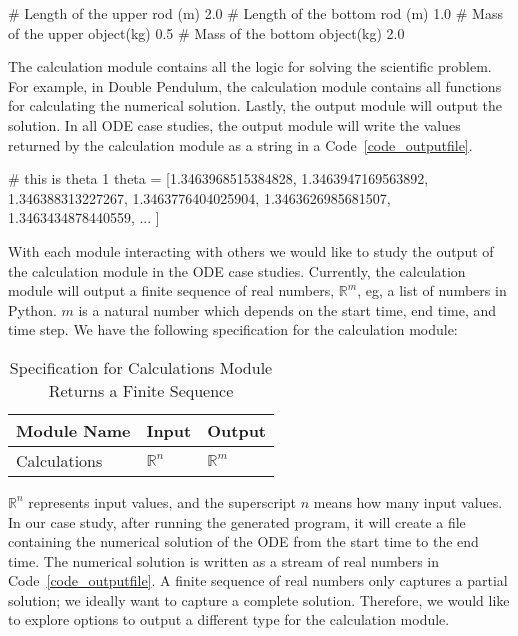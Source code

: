 \begin{listing}[ht]
\begin{python1}
# Length of the upper rod (m)
2.0
# Length of the bottom rod (m)
1.0
# Mass of the upper object(kg)
0.5
# Mass of the bottom object(kg)
2.0
\end{python1}
\label{code_inputfile}
\end{listing}

The calculation module contains all the logic for solving the scientific problem. For example, in Double Pendulum, the calculation module contains all functions for calculating the numerical solution. Lastly, the output module will output the solution. In all ODE case studies, the output module will write the values returned by the calculation module as a string in a Code~\ref{code_outputfile}. 

\begin{listing}[ht]
\begin{python1}
# this is theta 1
theta = [1.3463968515384828, 1.3463947169563892, 1.346388313227267, 1.3463776404025904, 1.3463626985681507, 1.3463434878440559, ... ]
\end{python1}
\label{code_outputfile}
\end{listing}

With each module interacting with others we would like to study the output of the calculation module in the ODE case studies. Currently, the calculation module will output a finite sequence of real numbers, $\mathbb{R}^m$, eg, a list of numbers in Python. $m$ is a natural number which depends on the start time, end time, and time step. We have the following specification for the calculation module:

\begin{table}[ht]
\centering
\begin{tabular}{p{} | p{} | p{}} \hline
    \textbf{Module Name}&\textbf{Input}&\textbf{Output}\\
    \toprule
    Calculations & $\mathbb{R}^n$ & $\mathbb{R}^m$ \\
    \bottomrule	
\end{tabular}	
\caption{Specification for Calculations Module Returns a Finite Sequence}	
\label{tab_srsforcal}
\end{table}
$\mathbb{R}^n$ represents input values, and the superscript $n$ means how many input values. In our case study, after running the generated program, it will create a file containing the numerical solution of the ODE from the start time to the end time. The numerical solution is written as a stream of real numbers in Code~\ref{code_outputfile}. A finite sequence of real numbers only captures a partial solution; we ideally want to capture a complete solution. Therefore, we would like to explore options to output a different type for the calculation module.

